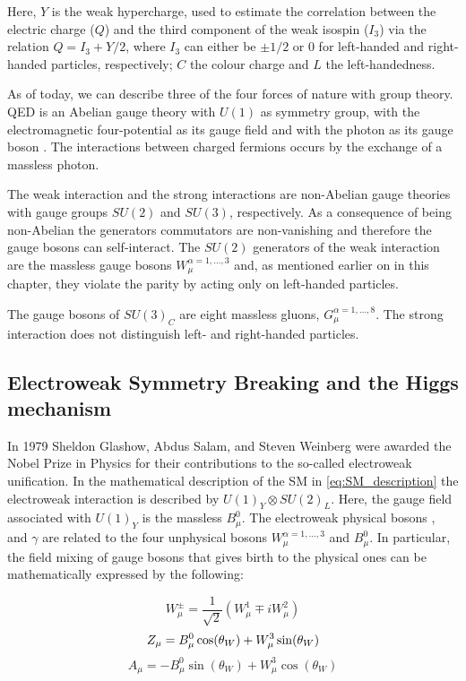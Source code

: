 				\noindent Here, $Y$ is the weak hypercharge, used to estimate the correlation between the electric charge ($Q$) and the third component of the weak isospin ($I_3$) via the relation $Q = I_3 + Y/2$, where $I_3$ can either be $\pm 1/2$ or $0$ for left-handed and right-handed particles, respectively; $C$ the colour charge and $L$ the left-handedness. 

				As of today, we can describe three of the four forces of nature with group theory. QED is an Abelian gauge theory with $U(1)$ as symmetry group, with the electromagnetic four-potential as its gauge field and with the photon as its gauge boson \cite{Pich2012}. The interactions between charged fermions occurs by the exchange of a massless photon. 

				The weak interaction and the strong interactions are non-Abelian gauge theories with gauge groups $SU(2)$ and $SU(3)$, respectively. As a consequence of being non-Abelian the generators commutators are non-vanishing and therefore the gauge bosons can self-interact. The $SU(2)$ generators of the weak interaction are the massless gauge bosons $W_{\mu}^{\alpha = 1,\dots,3}$ and, as mentioned earlier on in this chapter, they violate the parity by acting only on left-handed particles. 

				The gauge bosons of $SU(3)_C$ are eight massless gluons, $G_{\mu}^{\alpha=1,\dots,8}$. The strong interaction does not distinguish left- and right-handed particles. 


			\subsection*{Electroweak Symmetry Breaking and the Higgs mechanism}

				In 1979 Sheldon Glashow, Abdus Salam, and Steven Weinberg were awarded the Nobel Prize in Physics for their contributions to the so-called electroweak unification. In the mathematical description of the SM in \ref{eq:SM_description} the electroweak interaction is described by $U(1)_Y \otimes SU(2)_L$. Here, the gauge field associated with $U(1)_Y$ is the massless $B_\mu^0$. The electroweak physical bosons \Wboson, \Zboson and $\gamma$ are related to the four unphysical bosons $W_{\mu}^{\alpha = 1,\dots,3}$ and $B_\mu^0$. In particular, the field mixing of gauge bosons that gives birth to the physical ones can be mathematically expressed by the following: 

				\begin{equation}
					W_{\mu}^\pm = \frac{1}{\sqrt{2}} \displaystyle \left ( W_{\mu}^1 \mp i W_{\mu}^2 \right )
				\end{equation}
				\begin{equation}
					Z_{\mu} = B_{\mu}^0 \cos(\theta_W) + W_{\mu}^3 \sin (\theta_W) \\
				\end{equation}
				\begin{equation}
					A_{\mu} = - B_{\mu}^0 \sin(\theta_W) + W_{\mu}^3 \cos (\theta_W)
				\end{equation}

